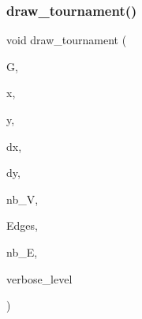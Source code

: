 \subsubsection{\texorpdfstring{draw\+\_\+tournament()}{draw\_tournament()}}
{\footnotesize\ttfamily void draw\+\_\+tournament (\begin{DoxyParamCaption}\item[{\mbox{\hyperlink{classmp__graphics}{mp\+\_\+graphics}} $\ast$}]{G,  }\item[{\mbox{\hyperlink{galois_8h_a09fddde158a3a20bd2dcadb609de11dc}{I\+NT}}}]{x,  }\item[{\mbox{\hyperlink{galois_8h_a09fddde158a3a20bd2dcadb609de11dc}{I\+NT}}}]{y,  }\item[{\mbox{\hyperlink{galois_8h_a09fddde158a3a20bd2dcadb609de11dc}{I\+NT}}}]{dx,  }\item[{\mbox{\hyperlink{galois_8h_a09fddde158a3a20bd2dcadb609de11dc}{I\+NT}}}]{dy,  }\item[{\mbox{\hyperlink{galois_8h_a09fddde158a3a20bd2dcadb609de11dc}{I\+NT}}}]{nb\+\_\+V,  }\item[{\mbox{\hyperlink{galois_8h_a09fddde158a3a20bd2dcadb609de11dc}{I\+NT}} $\ast$}]{Edges,  }\item[{\mbox{\hyperlink{galois_8h_a09fddde158a3a20bd2dcadb609de11dc}{I\+NT}}}]{nb\+\_\+E,  }\item[{\mbox{\hyperlink{galois_8h_a09fddde158a3a20bd2dcadb609de11dc}{I\+NT}}}]{verbose\+\_\+level }\end{DoxyParamCaption})}

\mbox{\label{draw_8_c_a1b0985015c8b8f4d6a4bbbe51833a5ad}} 

